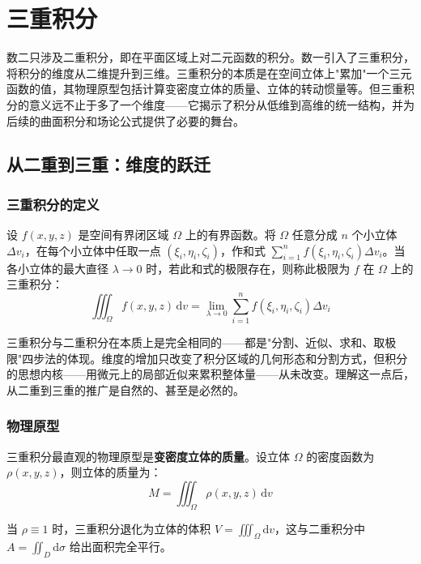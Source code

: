 
\section{三重积分}

数二只涉及二重积分，即在平面区域上对二元函数的积分。数一引入了三重积分，将积分的维度从二维提升到三维。三重积分的本质是在空间立体上"累加"一个三元函数的值，其物理原型包括计算变密度立体的质量、立体的转动惯量等。但三重积分的意义远不止于多了一个维度——它揭示了积分从低维到高维的统一结构，并为后续的曲面积分和场论公式提供了必要的舞台。

\subsection{从二重到三重：维度的跃迁}

\subsubsection{三重积分的定义}

设 $f(x,y,z)$ 是空间有界闭区域 $\Omega$ 上的有界函数。将 $\Omega$ 任意分成 $n$ 个小立体 $\Delta v_i$，在每个小立体中任取一点 $(\xi_i, \eta_i, \zeta_i)$，作和式 $\sum_{i=1}^n f(\xi_i, \eta_i, \zeta_i)\Delta v_i$。当各小立体的最大直径 $\lambda\to 0$ 时，若此和式的极限存在，则称此极限为 $f$ 在 $\Omega$ 上的三重积分：
\[
\iiint_\Omega f(x,y,z)\,\mathrm{d}v = \lim_{\lambda\to 0}\sum_{i=1}^n f(\xi_i, \eta_i, \zeta_i)\Delta v_i
\]

\begin{essencebox}
三重积分与二重积分在本质上是完全相同的——都是"分割、近似、求和、取极限"四步法的体现。维度的增加只改变了积分区域的几何形态和分割方式，但积分的思想内核——用微元上的局部近似来累积整体量——从未改变。理解这一点后，从二重到三重的推广是自然的、甚至是必然的。
\end{essencebox}

\subsubsection{物理原型}

三重积分最直观的物理原型是\textbf{变密度立体的质量}。设立体 $\Omega$ 的密度函数为 $\rho(x,y,z)$，则立体的质量为：
\[
M = \iiint_\Omega \rho(x,y,z)\,\mathrm{d}v
\]

当 $\rho\equiv 1$ 时，三重积分退化为立体的体积 $V = \iiint_\Omega \mathrm{d}v$，这与二重积分中 $A = \iint_D \mathrm{d}\sigma$ 给出面积完全平行。

